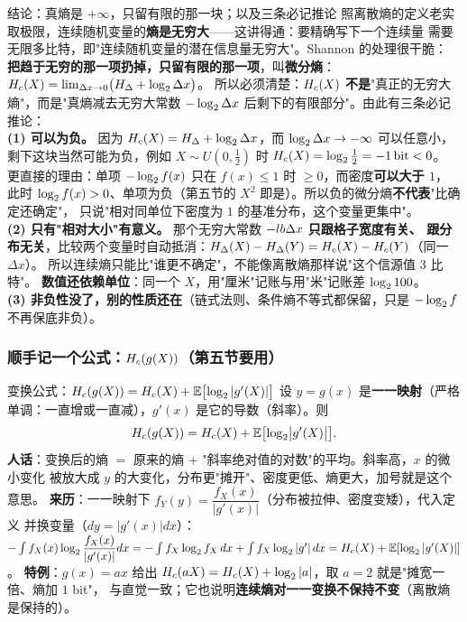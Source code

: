 \begin{defbox}{结论：真熵是 $+\infty$，只留有限的那一块；以及三条必记推论}
照离散熵的定义老实取极限，连续随机变量的\textbf{熵是无穷大}——这讲得通：要精确写下一个连续量
需要无限多比特，即"连续随机变量的潜在信息量无穷大"。Shannon 的处理很干脆：
\textbf{把趋于无穷的那一项扔掉，只留有限的那一项}，叫\textbf{微分熵}：
$H_{c}\!\left(X\right)=\lim_{\Delta x\to0}\bigl(H_\Delta+\log_{2}\Delta x\bigr)$。
所以必须清楚：$H_{c}\!\left(X\right)$ \textbf{不是}"真正的无穷大熵"，而是"真熵减去无穷大常数
$-\log_{2}\Delta x$ 后剩下的有限部分"。由此有三条必记推论：
\\[1pt]
\textbf{(1) 可以为负。} 因为 $H_{c}\!\left(X\right)=H_\Delta+\log_{2}\Delta x$，而 $\log_{2}\Delta x\to-\infty$ 可以任意小，
剩下这块当然可能为负，例如 $X\sim U(0,\tfrac12)$ 时 $H_{c}\!\left(X\right)=\log_{2}\tfrac12=-1\,\text{bit}<0$。
更直接的理由：单项 $-\log_{2} f(x)$ 只在 $f(x)\le1$ 时 $\ge0$，而密度\textbf{可以大于 $1$}，
此时 $\log_{2} f(x)>0$、单项为负（第五节的 $X^2$ 即是）。所以负的微分熵\textbf{不代表}"比确定还确定"，
只说"相对同单位下密度为 $1$ 的基准分布，这个变量更集中"。\\[1pt]
\textbf{(2) 只有"相对大小"有意义。} 那个无穷大常数 $-\\lb\Delta x$ \textbf{只跟格子宽度有关、
跟分布无关}，比较两个变量时自动抵消：$H_\Delta(X)-H_\Delta(Y)=H_{c}\!\left(X\right)-H_{c}\!\left(Y\right)$（同一 $\Delta x$）。
所以连续熵只能比"谁更不确定"，不能像离散熵那样说"这个信源值 3 比特"。
\textbf{数值还依赖单位}：同一个 $X$，用"厘米"记账与用"米"记账差 $\log_{2}100$。\\[1pt]
\textbf{(3) 非负性没了，别的性质还在}（链式法则、条件熵不等式都保留，只是 $-\log_{2} f$ 不再保底非负）。
\end{defbox}

\subsubsection{顺手记一个公式：$H_{c}\!\left(g(X)\right)$（第五节要用）}

\begin{defbox}{变换公式：$H_{c}\!\left(g(X)\right)=H_{c}\!\left(X\right)+\operatorname{\mathbb{E}}\bigl[\log_{2}|g'(X)|\bigr]$}
设 $y=g(x)$ 是\textbf{一一映射}（严格单调：一直增或一直减），$g'(x)$ 是它的导数（斜率）。则
\[
H_{c}\!\left(g(X)\right)=H_{c}\!\left(X\right)+\operatorname{\mathbb{E}}\bigl[\log_{2}\bigl|g'(X)\bigr|\bigr].
\]
\textbf{人话}：变换后的熵 $=$ 原来的熵 $+$ "斜率绝对值的对数"的平均。斜率高，$x$ 的微小变化
被放大成 $y$ 的大变化，分布更"摊开"、密度更低、熵更大，加号就是这个意思。
\textbf{来历}：一一映射下 $f_Y(y)=\dfrac{f_X(x)}{|g'(x)|}$（分布被拉伸、密度变矮），代入定义
并换变量（$dy=|g'(x)|dx$）：$-\int f_X(x)\log_{2}\dfrac{f_X(x)}{|g'(x)|}dx
=-\int f_X\log_{2} f_X\,dx+\int f_X\log_{2}|g'|\,dx=H_{c}\!\left(X\right)+\operatorname{\mathbb{E}}[\log_{2}|g'(X)|]$。
\textbf{特例}：$g(x)=ax$ 给出 $H_{c}\!\left(aX\right)=H_{c}\!\left(X\right)+\log_{2}|a|$，取 $a=2$ 就是"摊宽一倍、熵加 $1$ bit"，
与直觉一致；它也说明\textbf{连续熵对一一变换不保持不变}（离散熵是保持的）。
\end{defbox}

